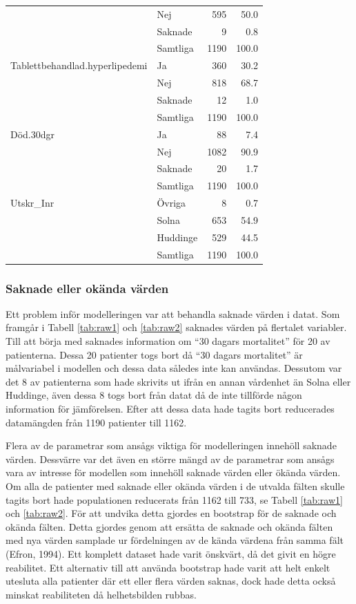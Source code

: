 \begin{table}[htbp]
{\begin{tabular}{ll|rr}
   & Nej & 595 & 50.0 \\ 
   & Saknade & 9 & 0.8 \\ 
   \hline
 & Samtliga & 1190 & 100.0 \\ 
   \hline
\hline
Tablettbehandlad.hyperlipedemi & Ja & 360 & 30.2 \\ 
   & Nej & 818 & 68.7 \\ 
   & Saknade & 12 & 1.0 \\ 
   \hline
 & Samtliga & 1190 & 100.0 \\ 
   \hline
\hline
Död.30dgr & Ja & 88 & 7.4 \\ 
   & Nej & 1082 & 90.9 \\ 
   & Saknade & 20 & 1.7 \\ 
   \hline
 & Samtliga & 1190 & 100.0 \\ 
   \hline
\hline
Utskr\_Inr & Övriga & 8 & 0.7 \\ 
   & Solna & 653 & 54.9 \\ 
   & Huddinge & 529 & 44.5 \\ 
   \hline
 & Samtliga & 1190 & 100.0 \\ 
   \hline
\hline
\end{tabular}
}

\end{table}


\subsubsection{Saknade eller okända värden}
Ett problem inför modelleringen var att behandla saknade värden i datat. Som framgår i Tabell \ref{tab:raw1} och \ref{tab:raw2} saknades värden på flertalet variabler. Till att börja med saknades information om “30 dagars mortalitet” för 20 av patienterna. Dessa 20 patienter togs bort då “30 dagars mortalitet” är målvariabel i modellen och dessa data således inte kan användas. Dessutom var det 8 av patienterna som hade skrivits ut ifrån en annan vårdenhet än Solna eller Huddinge, även dessa 8 togs bort från datat då de inte tillförde någon information för jämförelsen. Efter att dessa data hade tagits bort reducerades datamängden från 1190 patienter till 1162.

\newpage

Flera av de parametrar som ansågs viktiga för modelleringen innehöll  saknade värden. Dessvärre var det även en större mängd av de parametrar som ansågs vara av intresse för modellen som innehöll saknade värden eller ökända värden. Om alla de patienter med saknade eller okända värden i de utvalda fälten skulle tagits bort hade populationen reducerats från 1162 till 733, se Tabell \ref{tab:raw1} och \ref{tab:raw2}. För att undvika detta gjordes en bootstrap för de saknade och okända fälten. Detta gjordes genom att ersätta de saknade och okända fälten med nya värden samplade ur fördelningen av de kända värdena från samma fält (Efron, 1994). Ett komplett dataset hade varit önskvärt, då det givit en högre reabilitet. Ett alternativ till att använda bootstrap hade varit att helt enkelt utesluta alla patienter där ett eller flera värden saknas, dock hade detta också minskat reabiliteten då helhetsbilden rubbas. 

